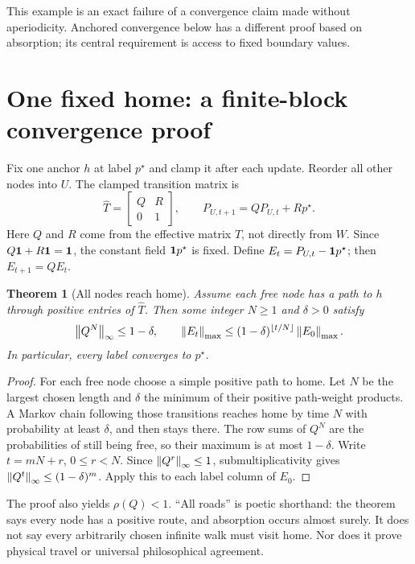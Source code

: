 \documentclass[12pt]{article}
\newtheorem{theorem}{Theorem}\newtheorem{proposition}[theorem]{Proposition}\newtheorem{lemma}[theorem]{Lemma}
\newcommand{\page}[1]{\section{#1}}
\begin{document}
This example is an exact failure of a convergence claim made without aperiodicity. Anchored convergence below has a different proof based on absorption; its central requirement is access to fixed boundary values.

\page{One fixed home: a finite-block convergence proof}
Fix one anchor $h$ at label $p^\star$ and clamp it after each update. Reorder all other nodes into $U$. The clamped transition matrix is
\begin{equation}\widehat T=\begin{bmatrix}Q&R\\0&1\end{bmatrix},\qquad P_{U,t+1}=QP_{U,t}+Rp^\star.\end{equation}
Here $Q$ and $R$ come from the effective matrix $T$, not directly from $W$. Since $Q\mathbf1+R\mathbf1=\mathbf1$, the constant field $\mathbf1 p^\star$ is fixed. Define $E_t=P_{U,t}-\mathbf1 p^\star$; then $E_{t+1}=QE_t$.
\begin{theorem}[All nodes reach home]
Assume each free node has a path to $h$ through positive entries of $\widehat T$. Then some integer $N\geq1$ and $\delta>0$ satisfy
\begin{equation}\left\lVert Q^N\right\rVert_\infty\leq1-\delta,\qquad \left\lVert E_t\right\rVert_{\max}\leq(1-\delta)^{\lfloor t/N\rfloor}\left\lVert E_0\right\rVert_{\max}.\end{equation}
In particular, every label converges to $p^\star$.
\end{theorem}
\begin{proof}
For each free node choose a simple positive path to home. Let $N$ be the largest chosen length and $\delta$ the minimum of their positive path-weight products. A Markov chain following those transitions reaches home by time $N$ with probability at least $\delta$, and then stays there. The row sums of $Q^N$ are the probabilities of still being free, so their maximum is at most $1-\delta$. Write $t=mN+r$, $0\leq r<N$. Since $\left\lVert Q^r\right\rVert_\infty\leq1$, submultiplicativity gives $\left\lVert Q^t\right\rVert_\infty\leq(1-\delta)^m$. Apply this to each label column of $E_0$.
\end{proof}
The proof also yields $\rho(Q)<1$. ``All roads'' is poetic shorthand: the theorem says every node has a positive route, and absorption occurs almost surely. It does not say every arbitrarily chosen infinite walk must visit home. Nor does it prove physical travel or universal philosophical agreement.
\end{document}
